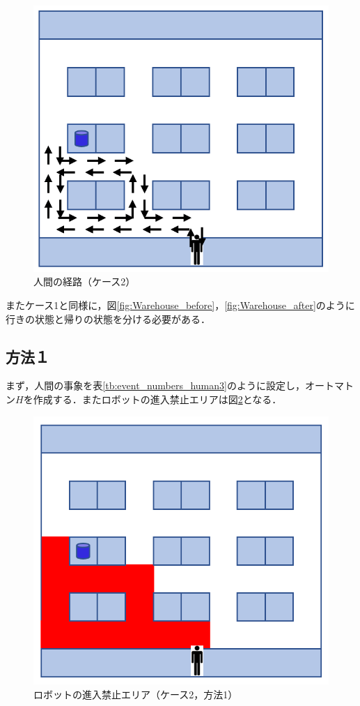 \begin{figure}[!t]
    \centering
    \includegraphics[scale=0.3]{figures/HITL1_case2_H.png}
    \caption{人間の経路（ケース2）}
    \label{fig:HITL1_case2_H}
\end{figure}

またケース1と同様に，図\ref{fig:Warehouse_before}，\ref{fig:Warehouse_after}のように行きの状態と帰りの状態を分ける必要がある．


\subsection{方法１}
まず，人間の事象を表\ref{tb:event_numbers_human3}のように設定し，オートマトン$H$を作成する．またロボットの進入禁止エリアは図\ref{fig:human_area_2}となる．

\begin{figure}[!t]
    \centering
    \includegraphics[scale=0.3]{figures/human_area_2.png}
    \caption{ロボットの進入禁止エリア（ケース2，方法1）}
    \label{fig:human_area_2}
\end{figure}

